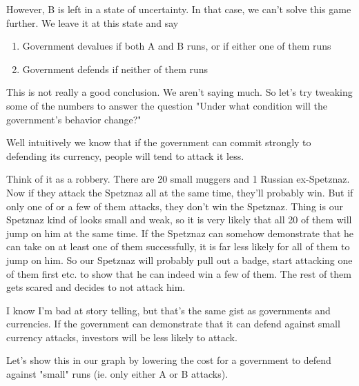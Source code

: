 \documentclass[11pt]{scrartcl}
\begin{document}
However, B is left in a state of uncertainty. In that case, we can't solve this game further. We leave it at this state and say

\begin{enumerate}
\item Government devalues if both A and B runs, or if either one of them runs
\item Government defends if neither of them runs
\end{enumerate}

This is not really a good conclusion. We aren't saying much. So let's try tweaking some of the numbers to answer the question "Under what condition will the government's behavior change?"

Well intuitively we know that if the government can commit strongly to defending its currency, people will tend to attack it less. 

Think of it as a robbery. There are 20 small muggers and 1  Russian ex-Spetznaz. Now if they attack the Spetznaz all at the same time, they'll probably win. But if only one of or a few of them attacks, they don't win the Spetznaz. Thing is our Spetznaz kind of looks small and weak, so it is very likely that all 20 of them will jump on him at the same time. If the Spetznaz can somehow demonstrate that he can take on at least one of them successfully, it is far less likely for all of them to jump on him. So our Spetznaz will probably pull out a badge, start attacking one of them first etc. to show that he can indeed win a few of them. The rest of them gets scared and decides to not attack him.

I know I'm bad at story telling, but that's the same gist as governments and currencies. If the government can demonstrate that it can defend against small currency attacks, investors will be less likely to attack.

Let's show this in our graph by lowering the cost for a government to defend against "small" runs (ie. only either A or B attacks).
\end{document}
